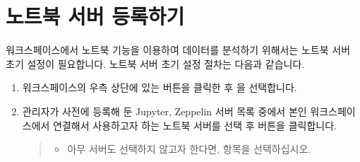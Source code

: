 \documentclass[letterpaper,10pt,english]{sphinxmanual}
\begin{document}
\section{노트북 서버 등록하기}
\label{\detokenize{discovery/part05/register_a_notebook_server:id1}}\label{\detokenize{discovery/part05/register_a_notebook_server::doc}}
워크스페이스에서 노트북 기능을 이용하여 데이터를 분석하기 위해서는 노트북 서버 초기 설정이 필요합니다. 노트북 서버 초기 설정 절차는 다음과 같습니다.
\begin{enumerate}
\def\theenumi{\arabic{enumi}}
\def\labelenumi{\theenumi .}
\makeatletter\def\p@enumii{\p@enumi \theenumi .}\makeatother
\item {} 
워크스페이스의 우측 상단에 있는  버튼을 클릭한 후 을 선택합니다.
\begin{quote}

\begin{figure}[H]
\centering

\noindent{}
\end{figure}
\end{quote}

\item {} 
관리자가 사전에 등록해 둔 Jupyter, Zeppelin 서버 목록 중에서 본인 워크스페이스에서 연결해서 사용하고자 하는 노트북 서버를 선택 후 버튼을 클릭합니다.
\begin{quote}
\begin{itemize}
\item {} 
아무 서버도 선택하지 않고자 한다면,  항목을 선택하십시오.

\end{itemize}

\begin{figure}[H]
\centering

\noindent{}
\end{figure}
\end{quote}

\end{enumerate}
\end{document}
